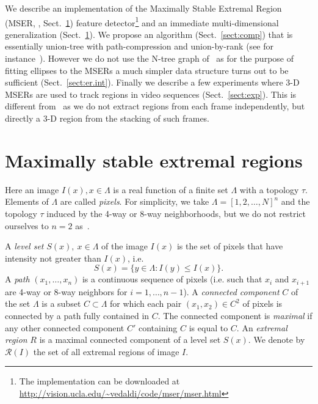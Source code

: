 \documentclass{article}
\begin{document}
We describe an implementation of the Maximally Stable Extremal Region (MSER, \cite{matas03robust}, Sect.~\ref{sect:def}) feature detector\footnote{The implementation can be downloaded at \url{http://vision.ucla.edu/~vedaldi/code/mser/mser.html}} and an immediate multi-dimensional generalization (Sect.~\ref{sect:def}). We propose an algorithm  (Sect.~\ref{sect:comp}) that is essentially union-tree with path-compression and union-by-rank (see for instance~\cite{murphy-chutorian06n-tree}). However we do not use the N-tree graph of~\cite{murphy-chutorian06n-tree} as for the purpose of fitting ellipses to the MSERs a much simpler data structure turns out to be sufficient (Sect.~\ref{sect:er.int}).  Finally we describe a few experiments where 3-D MSERs are used to track regions in video sequences (Sect.~\ref{sect:exp}). This is different from~\cite{donoser06efficient} as we do not extract regions from each frame independently, but directly a 3-D region from the stacking of such frames.

\section{Maximally stable extremal regions}\label{sect:def}


Here an image $I(x), x\in\Lambda$ is a real function of a finite set $\Lambda$ with a topology $\tau$. Elements of $\Lambda$ are called {\em pixels}. For simplicity, we take $\Lambda = [1,2,\dots,N]^n$ and the topology $\tau$ induced by the 4-way or 8-way neighborhoods, but we do not restrict ourselves to $n=2$ as~\cite{matas03robust}. 

A {\em level set} $S(x),\ x \in\Lambda$ of the image $I(x)$ is the set of pixels that have intensity not greater than $I(x)$, i.e.
\[
 S(x) = \{ y\in\Lambda : I(y) \leq I(x) \}.
\]
A {\em path} $(x_1,\dots,x_n)$ is a continuous sequence of pixels (i.e. such that $x_i$ and $x_{i+1}$ are 4-way or 8-way neighbors for $i=1,\dots,n-1$). A {\em connected component} $C$ of the set $\Lambda$ is a subset $C\subset\Lambda$ for which each pair $(x_1,x_2)\in C^2$ of pixels is connected by a path fully contained in $C$. The connected component is {\em maximal} if any other connected component $C'$ containing $C$ is equal to $C$. An {\em extremal region} $R$ is a maximal connected component of a level set $S(x)$. We denote by $\mathcal{R}(I)$ the set of all extremal regions of image $I$.
\end{document}
